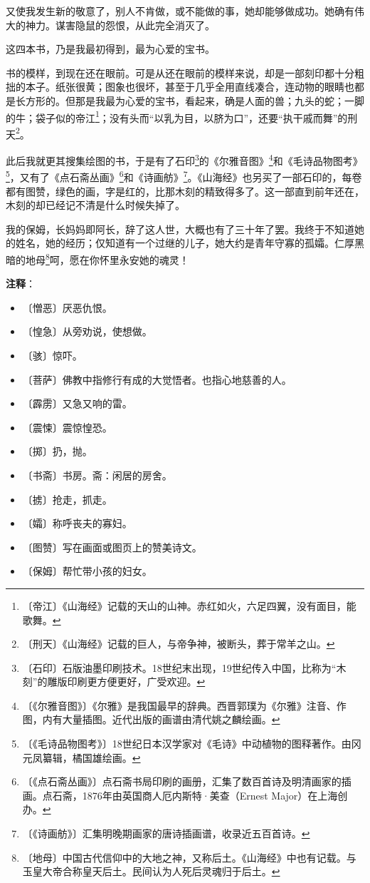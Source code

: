 \documentclass[12pt,UTF-8,openany]{ctexbook}
\begin{document}
\begin{large}
    又使我发生新的敬意了，别人不肯做，或不能做的事，她却能够做成功。她确有伟大的神力。谋害隐鼠的怨恨，从此完全消灭了。
    
    这四本书，乃是我最初得到，最为心爱的宝书。
    
    书的模样，到现在还在眼前。可是从还在眼前的模样来说，却是一部刻印都十分粗拙的本子。纸张很黄；图象也很坏，甚至于几乎全用直线凑合，连动物的眼睛也都是长方形的。但那是我最为心爱的宝书，看起来，确是人面的兽；九头的蛇；一脚的牛；袋子似的帝江\footnote{〔帝江〕《山海经》记载的天山的山神。赤红如火，六足四翼，没有面目，能歌舞。}；没有头而“以乳为目，以脐为口”，还要“执干戚而舞”的刑天\footnote{〔刑天〕《山海经》记载的巨人，与帝争神，被断头，葬于常羊之山。}。
    
    此后我就更其搜集绘图的书，于是有了石印\footnote{〔石印〕石版油墨印刷技术。18世纪末出现，19世纪传入中国，比称为“木刻”的雕版印刷更方便更好，广受欢迎。}的《尔雅音图》\footnote{〔《尔雅音图》〕《尔雅》是我国最早的辞典。西晋郭璞为《尔雅》注音、作图，内有大量插图。近代出版的画谱由清代姚之麟绘画。}和《毛诗品物图考》\footnote{〔《毛诗品物图考》〕18世纪日本汉学家对《毛诗》中动植物的图释著作。由冈元凤纂辑，橘国雄绘画。}，又有了《点石斋丛画》\footnote{〔《点石斋丛画》〕点石斋书局印刷的画册，汇集了数百首诗及明清画家的插画。点石斋，1876年由英国商人厄内斯特·美查（Ernest Major）在上海创办。}和《诗画舫》\footnote{〔《诗画舫》〕汇集明晚期画家的唐诗插画谱，收录近五百首诗。}。《山海经》也另买了一部石印的，每卷都有图赞，绿色的画，字是红的，比那木刻的精致得多了。这一部直到前年还在，木刻的却已经记不清是什么时候失掉了。
    
    我的保姆，长妈妈即阿长，辞了这人世，大概也有了三十年了罢。我终于不知道她的姓名，她的经历；仅知道有一个过继的儿子，她大约是青年守寡的孤孀。仁厚黑暗的地母\footnote{〔地母〕中国古代信仰中的大地之神，又称后土。《山海经》中也有记载。与玉皇大帝合称皇天后土。民间认为人死后灵魂归于后土。}呵，愿在你怀里永安她的魂灵！
    
\end{large}


\newpage

\textbf{注释}：

\vspace{-1em}

\begin{itemize}
    \setlength\itemsep{-0.2em}
    \item 〔憎恶〕厌恶仇恨。
    \item 〔惶急〕从旁劝说，使想做。
    \item 〔骇〕惊吓。
    \item 〔菩萨〕佛教中指修行有成的大觉悟者。也指心地慈善的人。
    \item 〔霹雳〕又急又响的雷。
    \item 〔震悚〕震惊惶恐。
    \item 〔掷〕扔，抛。
    \item 〔书斋〕书房。斋：闲居的房舍。
    \item 〔掳〕抢走，抓走。
    \item 〔孀〕称呼丧夫的寡妇。
    \item 〔图赞〕写在画面或图页上的赞美诗文。
    \item 〔保姆〕帮忙带小孩的妇女。
\end{itemize}
\end{document}
